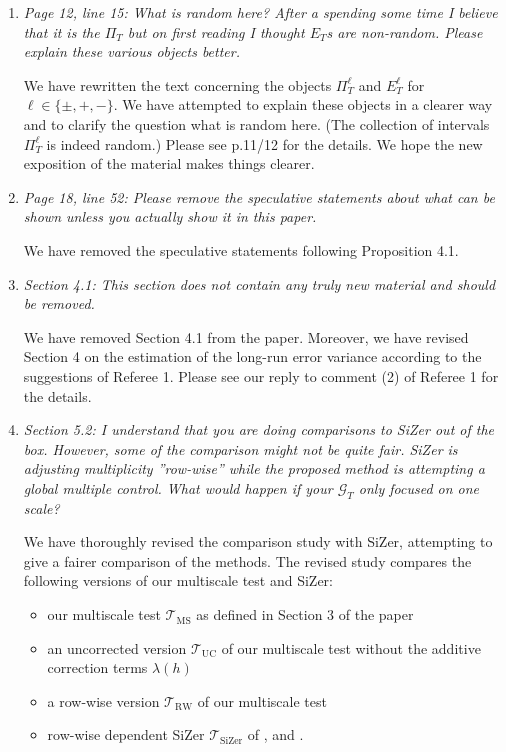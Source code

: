 \documentclass[a4paper,12pt]{article}
\begin{document}
\begin{enumerate}[label=(\arabic*),leftmargin=0.7cm]
\item \textit{Page 12, line 15: What is random here? After a spending some time I believe that it is the $\Pi_T$ but on first reading I thought $E_T$s are non-random. Please explain these various objects better.}

We have rewritten the text concerning the objects $\Pi_T^\ell$ and $E_T^\ell$ for $\ell \in \{\pm,+,-\}$. We have attempted to explain these objects in a clearer way and to clarify the question what is random here. (The collection of intervals $\Pi_T^\ell$ is indeed random.) Please see p.11/12 for the details. We hope the new exposition of the material makes things clearer.  


\item \textit{Page 18, line 52: Please remove the speculative statements about what can be shown unless you actually show it in this paper.}

We have removed the speculative statements following Proposition 4.1.


\item \textit{Section 4.1: This section does not contain any truly new material and should be removed.}

We have removed Section 4.1 from the paper. Moreover, we have revised Section 4 on the estimation of the long-run error variance according to the suggestions of Referee 1. Please see our reply to comment (2) of Referee 1 for the details. 


\item \textit{Section 5.2: I understand that you are doing comparisons to SiZer out of the box. However, some of the comparison might not be quite fair. SiZer is adjusting multiplicity ”row-wise” while the proposed method is attempting a global multiple control. What would happen if your $\mathcal{G}_T$ only focused on one scale?}

We have thoroughly revised the comparison study with SiZer, attempting to give a fairer comparison of the methods. The revised study compares the following versions of our multiscale test and SiZer: 
\begin{itemize}[leftmargin=0.5cm,itemsep=0cm]

\item our multiscale test $\mathcal{T}_{\text{MS}}$ as defined in Section 3 of the paper 
\item an uncorrected version $\mathcal{T}_{\text{UC}}$ of our multiscale test without the additive correction terms $\lambda(h)$ 
\item a row-wise version $\mathcal{T}_{\text{RW}}$ of our multiscale test 
\item row-wise dependent SiZer $\mathcal{T}_{\text{SiZer}}$ of \cite{Rondonotti2004}, \cite{Rondonotti2007} and \cite{ParkHannigKang2009}. 


\end{itemize}
\end{enumerate}
\end{document}
